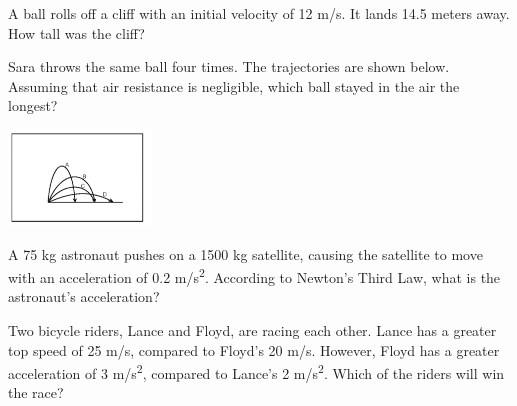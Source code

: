 \documentclass[10pt]{examdesign}
\begin{document}
\begin{multiplechoice} [title={Multiple Choice},
	rearrange=yes]
\begin{question}
	A ball rolls off a cliff with an initial velocity of 12 m/s.  It lands 14.5 meters away.  How tall was the cliff?
\end{question}

\begin{question}
Sara throws the same ball four times.  The trajectories are shown below. Assuming that air resistance is negligible, which ball stayed in the air the longest? 

\includegraphics[height={1in}]{proj.png}

\end{question}



\begin{question}
	A 75 kg astronaut pushes on a 1500 kg satellite, causing the satellite to move with an acceleration of 0.2 m/s\textsuperscript{2}. According to Newton's Third Law, what is the astronaut's acceleration?
\end{question}


\begin{question}
	Two bicycle riders, Lance and Floyd, are racing each other. Lance has a greater top speed of 25 m/s, compared to Floyd's 20 m/s.  However, Floyd has a greater acceleration of 3 m/s\textsuperscript{2}, compared to Lance's 2 m/s\textsuperscript{2}.  Which of the riders will win the race?
\end{question}


\end{multiplechoice}
\end{document}
